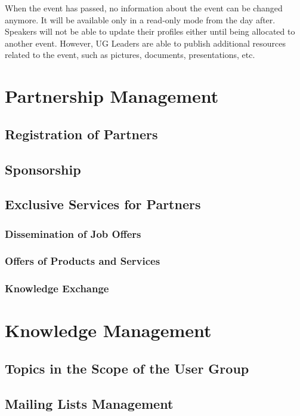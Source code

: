 \documentclass[envcountsame,envcountchap]{svmono}
\begin{document}
When the event has passed, no information about the event can be changed anymore. It will be available only in a read-only mode from the day after. Speakers will not be able to update their profiles either until being allocated to another event. However, UG Leaders are able to publish additional resources related to the event, such as pictures, documents, presentations, etc.

\chapter{Partnership Management}

\section{Registration of Partners}

\section{Sponsorship}

\section{Exclusive Services for Partners}

\subsection{Dissemination of Job Offers}

\subsection{Offers of Products and Services}

\subsection{Knowledge Exchange}

\chapter{Knowledge Management}

\section{Topics in the Scope of the User Group}

\section{Mailing Lists Management}
\end{document}
